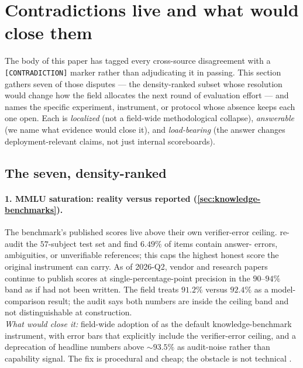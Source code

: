 
\section{Contradictions live and what would close them}
\label{sec:contradictions}
\label{sec:contradictions-live}

The body of this paper has tagged every cross-source disagreement
with a \texttt{[CONTRADICTION]} marker rather than adjudicating it
in passing. This section gathers seven of those disputes --- the
density-ranked subset whose resolution would change how the field
allocates the next round of evaluation effort --- and names the
specific experiment, instrument, or protocol whose absence keeps
each one open. Each is \emph{localized} (not a field-wide
methodological collapse), \emph{answerable} (we name what evidence
would close it), and \emph{load-bearing} (the answer changes
deployment-relevant claims, not just internal scoreboards).

\subsection{The seven, density-ranked}
\label{sec:contradictions-seven}

\paragraph{1. MMLU saturation: reality versus reported (\cref{sec:knowledge-benchmarks}).}
The benchmark's published scores live above their own
verifier-error ceiling. \citet{mmlu-redux-2024}%
re-audit the
$57$-subject test set and find $6.49\%$ of items contain
answer- errors, ambiguities, or unverifiable references; this
caps the highest honest score the original instrument can carry. As
of 2026-Q2, vendor and research papers continue to publish 
scores at single-percentage-point precision in the
$90$--$94\%$ band as if  had not been written. The field
treats $91.2\%$ versus $92.4\%$ as a model-comparison result; the
audit says both numbers are inside the ceiling band and not
distinguishable at construction.\\
\emph{What would close it:} field-wide adoption of  as
the default knowledge-benchmark instrument, with error bars that
explicitly include the verifier-error ceiling, and a deprecation
of headline  numbers above $\sim\!93.5\%$ as
audit-noise rather than capability signal. The fix is procedural
and cheap; the obstacle is not technical
\citep{hendrycks2021-mmlu, mmlu-redux-2024, wang2024-mmlu-pro}.

